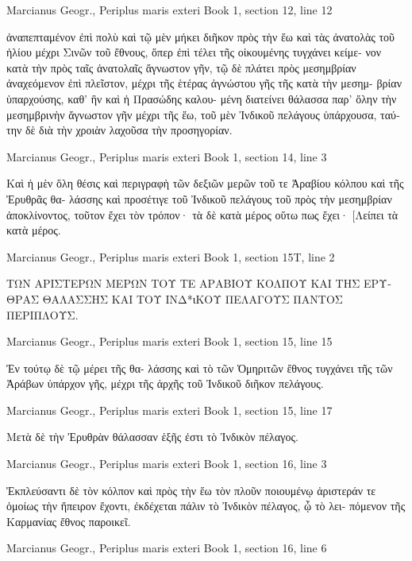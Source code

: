 \documentclass[12pt,letterpaper,twoside,final]{memoir}
\begin{document}
\begin{greek}
Marcianus Geogr., Periplus maris exteri 
Book 1, section 12, line 12


ἀναπεπταμένον ἐπὶ πολὺ καὶ τῷ μὲν μήκει διῆκον πρὸς 
τὴν ἕω καὶ τὰς ἀνατολὰς τοῦ ἡλίου μέχρι Σινῶν τοῦ 
ἔθνους, ὅπερ ἐπὶ τέλει τῆς οἰκουμένης τυγχάνει κείμε-
νον κατὰ τὴν πρὸς ταῖς ἀνατολαῖς ἄγνωστον γῆν, τῷ 
δὲ πλάτει πρὸς μεσημβρίαν ἀναχεόμενον ἐπὶ πλεῖστον, 
μέχρι τῆς ἑτέρας ἀγνώστου γῆς τῆς κατὰ τὴν μεσημ-
βρίαν ὑπαρχούσης, καθ' ἣν καὶ ἡ Πρασώδης καλου-
μένη διατείνει θάλασσα παρ' ὅλην τὴν μεσημβρινὴν 
ἄγνωστον γῆν μέχρι τῆς ἕω, τοῦ μὲν Ἰνδικοῦ πελάγους 
ὑπάρχουσα, ταύτην δὲ διὰ τὴν χροιὰν λαχοῦσα τὴν 
προσηγορίαν. 



Marcianus Geogr., Periplus maris exteri 
Book 1, section 14, line 3

Καὶ ἡ μὲν ὅλη θέσις καὶ περιγραφὴ τῶν δεξιῶν 
μερῶν τοῦ τε Ἀραβίου κόλπου καὶ τῆς Ἐρυθρᾶς θα-
λάσσης καὶ προσέτιγε τοῦ Ἰνδικοῦ πελάγους τοῦ πρὸς 
τὴν μεσημβρίαν ἀποκλίνοντος, τοῦτον ἔχει τὸν τρόπον· 
τὰ δὲ κατὰ μέρος οὕτω πως ἔχει· 
    [Λείπει τὰ κατὰ μέρος. 



Marcianus Geogr., Periplus maris exteri 
Book 1, section 15T, line 2

ΤΩΝ ΑΡΙΣΤΕΡΩΝ ΜΕΡΩΝ ΤΟΥ ΤΕ ΑΡΑΒΙΟΥ ΚΟΛΠΟΥ 
 ΚΑΙ ΤΗΣ ΕΡΥΘΡΑΣ ΘΑΛΑΣΣΗΣ ΚΑΙ ΤΟΥ ΙΝΔ*ιΚΟΥ 
 ΠΕΛΑΓΟΥΣ ΠΑΝΤΟΣ ΠΕΡΙΠΛΟΥΣ. 




Marcianus Geogr., Periplus maris exteri 
Book 1, section 15, line 15

                        Ἐν τούτῳ δὲ τῷ μέρει τῆς θα-
λάσσης καὶ τὸ τῶν Ὁμηριτῶν ἔθνος τυγχάνει τῆς τῶν 
Ἀράβων ὑπάρχον γῆς, μέχρι τῆς ἀρχῆς τοῦ Ἰνδικοῦ 
διῆκον πελάγους. 



Marcianus Geogr., Periplus maris exteri 
Book 1, section 15, line 17

                   Μετὰ δὲ τὴν Ἐρυθρὰν θάλασσαν 
ἑξῆς ἐστι τὸ Ἰνδικὸν πέλαγος. 



Marcianus Geogr., Periplus maris exteri 
Book 1, section 16, line 3

Ἐκπλεύσαντι δὲ τὸν κόλπον καὶ πρὸς τὴν ἕω 
τὸν πλοῦν ποιουμένῳ ἀριστεράν τε ὁμοίως τὴν ἤπειρον 
ἔχοντι, ἐκδέχεται πάλιν τὸ Ἰνδικὸν πέλαγος, ᾧ τὸ λει-
πόμενον τῆς Καρμανίας ἔθνος παροικεῖ. 



Marcianus Geogr., Periplus maris exteri 
Book 1, section 16, line 6


\end{greek}
\end{document}
